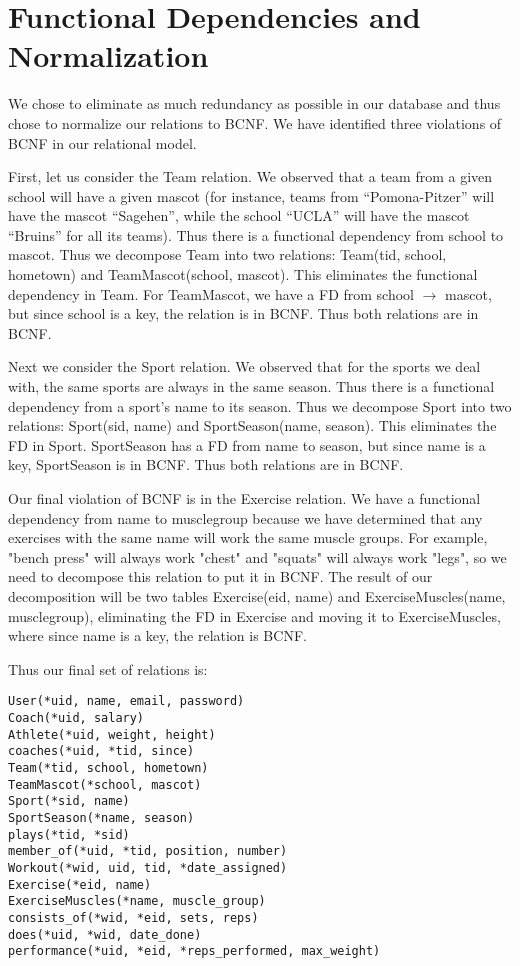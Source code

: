 \documentclass{article}
\begin{document}
\section*{Functional Dependencies and Normalization}

We chose to eliminate as much redundancy as possible in our database and thus chose to normalize our relations to BCNF.  We have identified three violations of BCNF in our relational model. 

First, let us consider the Team relation.  We observed that a team from a given school 
will have a given mascot (for instance, teams from ``Pomona-Pitzer'' will have the mascot
``Sagehen'', while the school ``UCLA'' will have the mascot ``Bruins'' for all its teams). Thus there is 
a functional dependency from school to mascot. Thus we decompose Team into two relations:
Team(tid, school, hometown) and TeamMascot(school, mascot). This eliminates the functional
dependency in Team. For TeamMascot, we have a FD from school $\to$ mascot, but since school
is a key, the relation is in BCNF. Thus both relations are in BCNF.

Next we consider the Sport relation. We observed that for the sports we deal with, the same 
sports are always in the same season. Thus there is a functional dependency from a sport's
name to its season. Thus we decompose Sport into two relations: Sport(sid, name) and 
SportSeason(name, season). This eliminates the FD in Sport. SportSeason has a FD from
name to season, but since name is a key, SportSeason is in BCNF. Thus both relations 
are in BCNF. 

Our final violation of BCNF is in the Exercise relation.  We have a functional dependency from name to muscle\underline{\hspace{2mm}}group because we have determined that any exercises with the same name will work the same muscle groups.  For example, "bench press" will always work "chest" and "squats" will always work "legs", so we need to decompose this relation to put it in BCNF.  The result of our decomposition will be two tables Exercise(eid, name) and ExerciseMuscles(name, muscle\underline{\hspace{2mm}}group), eliminating the FD in Exercise and moving it to ExerciseMuscles, where since name is a key, the relation is BCNF.

Thus our final set of relations is:
    \begin{verbatim}
User(*uid, name, email, password)
Coach(*uid, salary)
Athlete(*uid, weight, height)
coaches(*uid, *tid, since)
Team(*tid, school, hometown)
TeamMascot(*school, mascot)
Sport(*sid, name)
SportSeason(*name, season)
plays(*tid, *sid)
member_of(*uid, *tid, position, number)
Workout(*wid, uid, tid, *date_assigned)
Exercise(*eid, name)
ExerciseMuscles(*name, muscle_group)
consists_of(*wid, *eid, sets, reps)
does(*uid, *wid, date_done)
performance(*uid, *eid, *reps_performed, max_weight)
    \end{verbatim}
\end{document}
